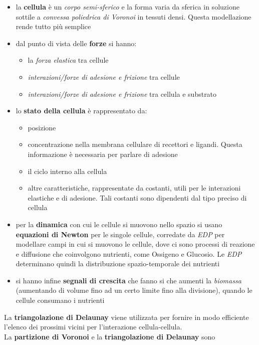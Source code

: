 \documentclass[a4paper,12pt, oneside]{book}
\begin{document}
\begin{itemize}
  \item la \textbf{cellula} è un \textit{corpo semi-sferico} e la forma varia da
  sferica in soluzione sottile a \textit{convessa poliedrica di Voronoi} in
  tessuti densi. Questa modellazione rende tutto più semplice
  \item dal punto di vista delle \textbf{forze} si hanno:
  \begin{itemize}
    \item la \textit{forza elastica} tra cellule
    \item \textit{interazioni/forze di adesione e frizione} tra cellule
    \item \textit{interazioni/forze di adesione e frizione} tra cellula e
    substrato 
  \end{itemize}
  \item lo \textbf{stato della cellula} è rappresentato da:
  \begin{itemize}
    \item posizione
    \item concentrazione nella membrana cellulare di recettori e ligandi. Questa
    informazione è necessaria per parlare di adesione
    \item il ciclo interno alla cellula
    \item altre caratteristiche, rappresentate da costanti, utili per le
    interazioni elastiche e di adesione. Tali costanti sono dipendenti dal tipo
    preciso di cellula 
  \end{itemize}
  \item per la \textbf{dinamica} con cui le cellule si muovono nello spazio si
  usano \textbf{equazioni di Newton} per le singole cellule, corredate da
  \textit{EDP} per modellare campi in cui si muovono le cellule, dove ci sono
  processi di reazione e diffusione che coinvolgono nutrienti, come Ossigeno e
  Glucosio. Le \textit{EDP} determinano quindi la distribuzione spazio-temporale
  dei nutrienti 
  \item si hanno infine \textbf{segnali di crescita} che fanno si che aumenti la
  \textit{biomassa} (aumentando di volume fino ad un certo limite fino alla
  divisione), quando le cellule consumano i nutrienti
\end{itemize}
La \textbf{triangolazione di Delaunay} viene utilizzata per fornire in modo
efficiente l'elenco dei prossimi vicini per l'interazione cellula-cellula.\\
La \textbf{partizione di Voronoi} e la \textbf{triangolazione di Delaunay} sono
\end{document}
